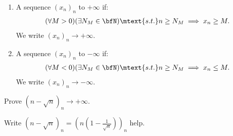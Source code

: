     \begin{definition}
        \phantom{a}
        \begin{enumerate}[label = (\arabic*)]
            \item A sequence $(x_n)_n$  to $+\infty$ if:
                \begin{equation*}
                \begin{split}
                    (\forall M > 0)(\exists N_M \in \bfN)\mtext{s.t.}n \geq N_M \implies x_n \geq M.
                \end{split}
                \end{equation*}
            We write $(x_n)_n \rightarrow +\infty$.

            \item A sequence $(x_n)_n$  to $-\infty$ if:
                \begin{equation*}
                \begin{split}
                    (\forall M<0)(\exists N_M \in \bfN)\mtext{s.t.}n \geq N_M \implies x_n \leq M.
                \end{split}
                \end{equation*}
                We write $(x_n)_n \rightarrow -\infty$.
        \end{enumerate}
    \end{definition}

    \begin{example}
        Prove $(n-\sqrt{n})_n \rightarrow +\infty$.
    \end{example}
        \begin{solution}
            Write $(n-\sqrt{n})_n = \left(n\left(1-\frac{1}{\sqrt{n}}\right)\right)_n$ {\color{red} help}.
        \end{solution}

